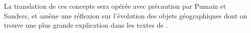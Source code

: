 
La translation de ces concepts sera opérée avec précaution par Pumain et Sanders, et amène une réflexion sur l'évolution des objets géographiques dont on trouve une plus grande explication dans les textes de \textcite{Pumain1982b, Pumain1989}.









